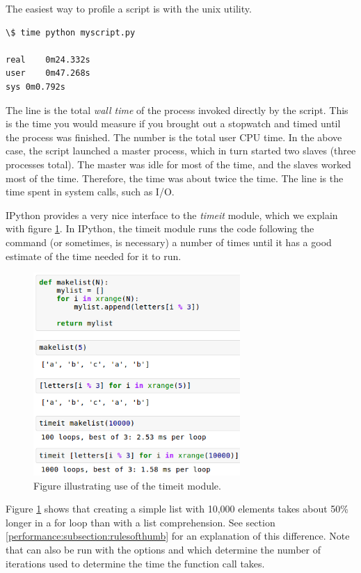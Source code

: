 The easiest way to profile a script is with the unix  utility.
\begin{verbatim}
\$ time python myscript.py

real	0m24.332s
user	0m47.268s
sys	0m0.792s
\end{verbatim}
The  line is the total \emph{wall time} of the process invoked directly by the script.  This is the time you would measure if you brought out a stopwatch and timed until the process was finished.  The  number is the total user CPU time.  In the above case, the script launched a master process, which in turn started two slaves (three processes total).  The master was idle for most of the time, and the slaves worked most of the time.  Therefore, the  time was about twice the  time.  The  line is the time spent in system calls, such as I/O.

IPython provides a very nice interface to the \emph{timeit} module, which we explain with figure \ref{performance:fig:timeit_1}. In IPython, the timeit module runs the code following the command  (or sometimes,  is necessary) a number of times until it has a good estimate of the time needed for it to run.  
\begin{figure}
  \includegraphics[width=0.7\textwidth]{../images/timeit_1}
  \caption{Figure illustrating use of the timeit module.}
  \label{performance:fig:timeit_1}
\end{figure}
Figure \ref{performance:fig:timeit_1} shows that creating a simple list with 10,000 elements takes about 50\% longer in a for loop than with a list comprehension.  See section \ref{performance:subsection:rulesofthumb} for an explanation of this difference.  Note that  can also be run with the options  and  which determine the number of iterations used to determine the time the function call takes.

